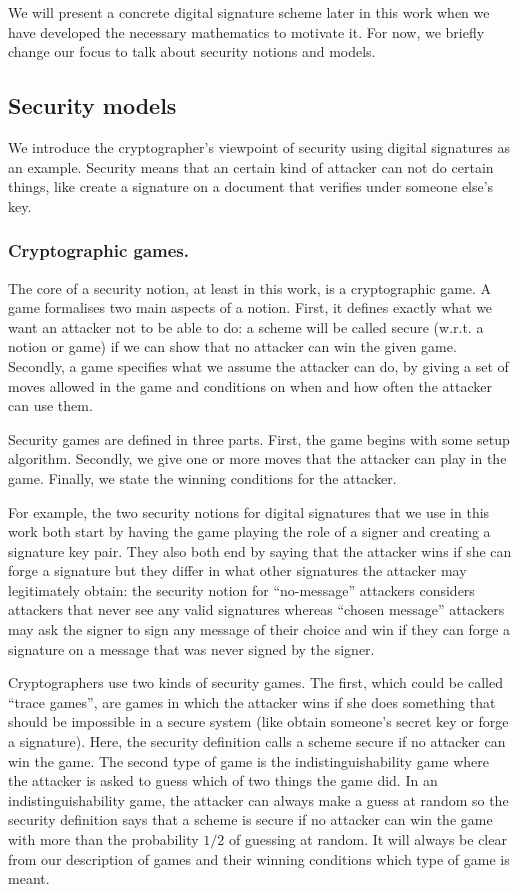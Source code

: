 \documentclass[envcountsame]{llncs}
\begin{document}
We will present a concrete digital signature scheme later in this work when we
have developed the necessary mathematics to motivate it. For now, we briefly
change our focus to talk about security notions and models.

\subsection{Security models}

We introduce the cryptographer's viewpoint of security using digital signatures
as an example. Security means that an certain kind of attacker can not do
certain things, like create a signature on a document that verifies under
someone else's key.

\subsubsection{Cryptographic games.}
The core of a security notion, at least in this work, is a cryptographic game. A
game formalises two main aspects of a notion. First, it defines exactly what we
want an attacker not to be able to do: a scheme will be called secure (w.r.t. a
notion or game) if we can show that no attacker can win the given game.
Secondly, a game specifies what we assume the attacker can do, by giving a set
of moves allowed in the game and conditions on when and how often the attacker
can use them.

Security games are defined in three parts. First, the game begins with some
setup algorithm. Secondly, we give one or more moves that the attacker can play
in the game. Finally, we state the winning conditions for the attacker.

For example, the two security notions for digital signatures that we use in this
work both start by having the game playing the role of a signer and creating a
signature key pair. They also both end by saying that the attacker wins if she
can forge a signature but they differ in what other signatures the attacker may
legitimately obtain: the security notion for ``no-message'' attackers considers
attackers that never see any valid signatures whereas ``chosen message''
attackers may ask the signer to sign any message of their choice and win if they
can forge a signature on a message that was never signed by the signer.

Cryptographers use two kinds of security games. The first, which could be called
``trace games'', are games in which the attacker wins if she does something that
should be impossible in a secure system (like obtain someone's secret key or
forge a signature). Here, the security definition calls a scheme secure if no
attacker can win the game. The second type of game is the indistinguishability
game where the attacker is asked to guess which of two things the game did. In
an indistinguishability game, the attacker can always make a guess at random so
the security definition says that a scheme is secure if no attacker can win the
game with more than the probability $1/2$ of guessing at random. It will always
be clear from our description of games and their winning conditions which type
of game is meant.
\end{document}
